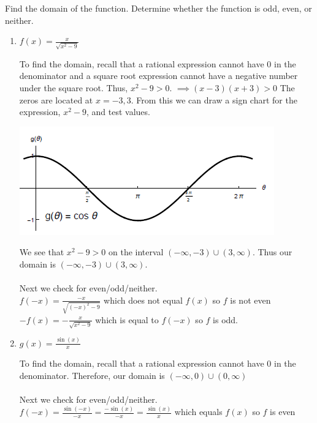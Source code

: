 \documentclass[nooutcomes]{ximera}
\begin{document}
\begin{problem}
Find the domain of the function.  Determine whether the function is odd, even, or neither.

\begin{enumerate}
	\item $f(x)=\frac{x}{\sqrt{x^2-9}}$
		\begin{freeResponse}
			To find the domain, recall that a rational expression cannot have $0$ in the denominator and a square root expression cannot have a negative number under the square root.  Thus, $x^2-9>0$.
			$\implies (x-3)(x+3)>0$  The zeros are located at $x=-3,3$.  From this we can draw a sign chart  for the expression, $x^2-9$, and test values.
		\begin{image}		
	\includegraphics[scale=0.2]{Figure9.png}
	\end{image}
		We see that $x^2-9>0$ on the interval $(-\infty,-3)\cup (3,\infty)$.  Thus our domain is $(-\infty,-3)\cup (3,\infty)$.\\ \\

		Next we check for even/odd/neither.\\
		$f(-x)=\frac{-x}{\sqrt{(-x)^2-9}}$ which does not equal $f(x)$ so $f$ is not even\\
		$-f(x)=-\frac{x}{\sqrt{x^2-9}}$ which is equal to $f(-x)$ so $f$ is odd.
		
		\end{freeResponse}

	\item $g(x)= \frac{\sin(x)}{x}$
		\begin{freeResponse}
	To find the domain, recall that a rational expression cannot have $0$ in the denominator.  Therefore, our domain is $(-\infty,0) \cup (0,\infty)$\\ \\
	
	Next we check for even/odd/neither.\\
		$f(-x)= \frac{\sin(-x)}{-x}=\frac{-\sin(x)}{-x}=\frac{\sin(x)}{x}$ which equals $f(x)$ so $f$ is even



\end{freeResponse}
\end{enumerate}
\end{problem}
\end{document}
